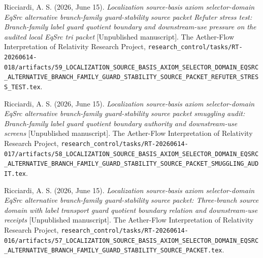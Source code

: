 \documentclass[11pt]{article}
\begin{document}
Ricciardi, A. S. (2026, June 15). \emph{Localization source-basis axiom
selector-domain EqSrc alternative branch-family guard-stability source
packet Refuter stress test: Branch-family label guard quotient boundary
and downstream-use pressure on the audited local EqSrc tri packet}
[Unpublished manuscript]. The Aether-Flow Interpretation of Relativity
Research Project,
\texttt{research\_control/tasks/RT-20260614-018/artifacts/59\_LOCALIZATION\_SOURCE\_BASIS\_AXIOM\_SELECTOR\_DOMAIN\_EQSRC\_ALTERNATIVE\_BRANCH\_FAMILY\_GUARD\_STABILITY\_SOURCE\_PACKET\_REFUTER\_STRESS\_TEST.tex}.

Ricciardi, A. S. (2026, June 15). \emph{Localization source-basis axiom
selector-domain EqSrc alternative branch-family guard-stability source
packet smuggling audit: Branch-family label guard quotient boundary
authority and downstream-use screens} [Unpublished manuscript]. The
Aether-Flow Interpretation of Relativity Research Project,
\texttt{research\_control/tasks/RT-20260614-017/artifacts/58\_LOCALIZATION\_SOURCE\_BASIS\_AXIOM\_SELECTOR\_DOMAIN\_EQSRC\_ALTERNATIVE\_BRANCH\_FAMILY\_GUARD\_STABILITY\_SOURCE\_PACKET\_SMUGGLING\_AUDIT.tex}.

Ricciardi, A. S. (2026, June 15). \emph{Localization source-basis axiom
selector-domain EqSrc alternative branch-family guard-stability source
packet: Three-branch source domain with label transport guard quotient
boundary relation and downstream-use receipts} [Unpublished manuscript].
The Aether-Flow Interpretation of Relativity Research Project,
\texttt{research\_control/tasks/RT-20260614-016/artifacts/57\_LOCALIZATION\_SOURCE\_BASIS\_AXIOM\_SELECTOR\_DOMAIN\_EQSRC\_ALTERNATIVE\_BRANCH\_FAMILY\_GUARD\_STABILITY\_SOURCE\_PACKET.tex}.
\end{document}
